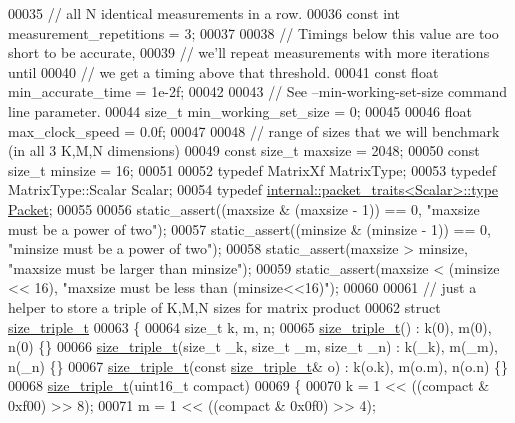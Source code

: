 \begin{DoxyCode}
00035 \textcolor{comment}{// all N identical measurements in a row.}
00036 \textcolor{keyword}{const} \textcolor{keywordtype}{int} measurement\_repetitions = 3;
00037 
00038 \textcolor{comment}{// Timings below this value are too short to be accurate,}
00039 \textcolor{comment}{// we'll repeat measurements with more iterations until}
00040 \textcolor{comment}{// we get a timing above that threshold.}
00041 \textcolor{keyword}{const} \textcolor{keywordtype}{float} min\_accurate\_time = 1e-2f;
00042 
00043 \textcolor{comment}{// See --min-working-set-size command line parameter.}
00044 \textcolor{keywordtype}{size\_t} min\_working\_set\_size = 0;
00045 
00046 \textcolor{keywordtype}{float} max\_clock\_speed = 0.0f;
00047 
00048 \textcolor{comment}{// range of sizes that we will benchmark (in all 3 K,M,N dimensions)}
00049 \textcolor{keyword}{const} \textcolor{keywordtype}{size\_t} maxsize = 2048;
00050 \textcolor{keyword}{const} \textcolor{keywordtype}{size\_t} minsize = 16;
00051 
00052 \textcolor{keyword}{typedef} MatrixXf MatrixType;
00053 \textcolor{keyword}{typedef} MatrixType::Scalar Scalar;
00054 \textcolor{keyword}{typedef} \hyperlink{group___sparse_core___module}{internal::packet\_traits<Scalar>::type} 
      \hyperlink{group___sparse_core___module}{Packet};
00055 
00056 static\_assert((maxsize & (maxsize - 1)) == 0, \textcolor{stringliteral}{"maxsize must be a power of two"});
00057 static\_assert((minsize & (minsize - 1)) == 0, \textcolor{stringliteral}{"minsize must be a power of two"});
00058 static\_assert(maxsize > minsize, \textcolor{stringliteral}{"maxsize must be larger than minsize"});
00059 static\_assert(maxsize < (minsize << 16), \textcolor{stringliteral}{"maxsize must be less than (minsize<<16)"});
00060 
00061 \textcolor{comment}{// just a helper to store a triple of K,M,N sizes for matrix product}
00062 \textcolor{keyword}{struct }\hyperlink{structsize__triple__t}{size\_triple\_t}
00063 \{
00064   \textcolor{keywordtype}{size\_t} k, m, n;
00065   \hyperlink{structsize__triple__t}{size\_triple\_t}() : k(0), m(0), n(0) \{\}
00066   \hyperlink{structsize__triple__t}{size\_triple\_t}(\textcolor{keywordtype}{size\_t} \_k, \textcolor{keywordtype}{size\_t} \_m, \textcolor{keywordtype}{size\_t} \_n) : k(\_k), m(\_m), n(\_n) \{\}
00067   \hyperlink{structsize__triple__t}{size\_triple\_t}(\textcolor{keyword}{const} \hyperlink{structsize__triple__t}{size\_triple\_t}& o) : k(o.k), m(o.m), n(o.n) \{\}
00068   \hyperlink{structsize__triple__t}{size\_triple\_t}(uint16\_t compact)
00069   \{
00070     k = 1 << ((compact & 0xf00) >> 8);
00071     m = 1 << ((compact & 0x0f0) >> 4);

\end{DoxyCode}
